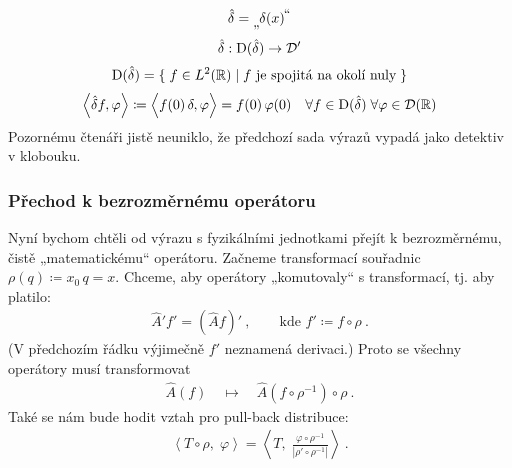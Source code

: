 \documentclass{article}
\newcommand\kludgequote[1]{%
    \prescript {} {\text{\normalsize„}} {\mkern-1.5mu#1} 
    {\vphantom{#1}}^{\mkern-1.5mu\text{\normalsize\raisebox{-0.5ex}{“}}}}
\def\vph{\vphantom}
\newcommand{\R}{\mathbb{R}}
\begin{document}
\begin{gather*}
    \hat\delta = \kludgequote{ \delta(x) } \\[3pt]
    \hat\delta: {\rm D}(\hat\delta) \to \mathcal{D}' \\[2pt]
    {\rm D}(\hat\delta) = \{ \; f \in L^2(\R) \;|\; f \text{ je spojitá na okolí nuly} \; \} \\[2pt]
    \left< \hat\delta f, \varphi \right>
    \coloneqq \left< \vph{\hat\delta} f(0) \, \delta, \varphi \right>
    = f(0) \, \varphi(0)
    \quad \forall f \in {\rm D}(\hat\delta) \; \forall \varphi \in \mathcal{D}(\R)
    \\
\end{gather*}
Pozornému čtenáři jistě neuniklo, že předchozí sada výrazů vypadá jako detektiv v klobouku. 

\subsubsection*{Přechod k bezrozměrnému operátoru}
Nyní bychom chtěli od výrazu s fyzikálními jednotkami přejít k bezrozměrnému, čistě „matematickému“ operátoru. Začneme transformací souřadnic $\rho(q) \coloneqq x_0 \, q = x$. Chceme, aby operátory „komutovaly“ s transformací, tj. aby platilo:
\begin{align*}
    \hat A' f' = (\hat A f)' \: ,
    \qquad
    \text{kde } f' \coloneqq f \circ \rho \: .
\end{align*}
(V předchozím řádku výjimečně $f'$ neznamená derivaci.) Proto se všechny operátory musí transformovat
\begin{align*}
    \hat A(f) \quad \mapsto \quad \hat A(f \circ \rho^{-1}) \circ \rho \: .
\end{align*}
Také se nám bude hodit vztah pro pull-back distribuce:
\begin{align*}
    \left<T \circ \rho, \; \varphi \right> = \left<T, \; \frac{\varphi \circ \rho^{-1}}{|\rho' \circ \rho^{-1}|} \right> \: .
\end{align*}
\pagebreak
\end{document}
